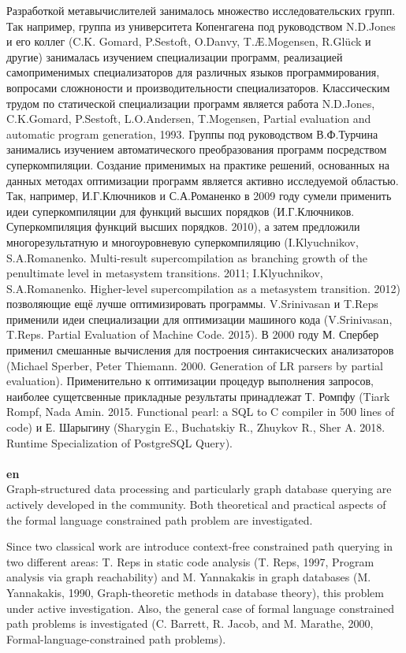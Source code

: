 \documentclass[12pt]{article}  %
\theoremstyle{remark}
\begin{document}
Разработкой метавычислителей занималось множество исследовательских групп.
Так например, группа из университета Копенгагена под руководством N.D.Jones и его коллег (C.K. Gomard, P.Sestoft, O.Danvy, T.Æ.Mogensen, R.Glück и другие) занималась изучением специализации программ, реализацией самоприменимых специализаторов для различных языков программирования, вопросами сложноности и производительности специализаторов.
Классическим трудом по статической специализации программ является работа N.D.Jones, C.K.Gomard, P.Sestoft, L.O.Andersen, T.Mogensen,
Partial evaluation and automatic program generation, 1993.
Группы под руководством В.Ф.Турчина занимались изучением автоматического преобразования программ посредством суперкомпиляции.
Создание применимых на практике решений, основанных на данных методах оптимизации программ является активно исследуемой областью.
Так, например, И.Г.Ключников и С.А.Романенко в 2009 году сумели применить идеи суперкомпиляции для функций высших порядков (И.Г.Ключников. Суперкомпиляция функций высших порядков. 2010),
а затем предложили многорезультатную и многоуровневую суперкомпиляцию
(I.Klyuchnikov, S.A.Romanenko. Multi-result supercompilation as branching growth of the penultimate level in metasystem transitions. 2011; I.Klyuchnikov, S.A.Romanenko. Higher-level supercompilation as a metasystem transition. 2012) позволяющие ещё лучше оптимизировать программы.
V.Srinivasan и T.Reps применили идеи специализации для оптимизации машиного кода (V.Srinivasan, T.Reps. Partial Evaluation of Machine Code. 2015).
В 2000 году М. Спербер применил смешанные вычисления для построения синтакисческих анализаторов (Michael Sperber, Peter Thiemann. 2000. Generation of LR parsers by partial evaluation).
Применительно к оптимизации процедур выполнения запросов, наиболее сущетсвенные прикладные результаты принадлежат Т. Ромпфу (Tiark Rompf, Nada Amin. 2015. Functional pearl: a SQL to C compiler in 500 lines of code) и Е. Шарыгину (Sharygin E., Buchatskiy R., Zhuykov R., Sher A. 2018. Runtime Specialization of PostgreSQL Query).
\\
\\
\textbf{en}\\

Graph-structured data processing and particularly graph database querying are actively developed in the community. Both theoretical and practical aspects of the formal language constrained path problem are investigated.

Since two classical work are introduce context-free constrained path querying in two different areas: T. Reps in static code analysis (T. Reps, 1997, Program analysis via graph reachability) and M. Yannakakis in graph databases (M. Yannakakis, 1990, Graph-theoretic methods in database theory), this problem under active investigation. Also, the general case of formal language constrained path problems is investigated (C. Barrett, R. Jacob, and M. Marathe, 2000, Formal-language-constrained path problems).
\end{document}
